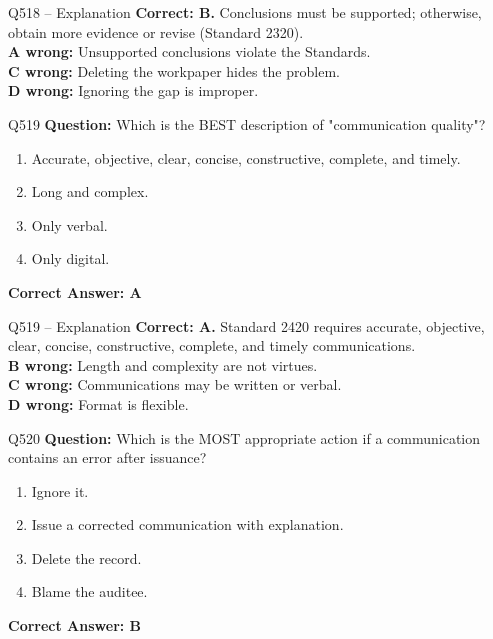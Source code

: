 \documentclass[aspectratio=169,10pt]{beamer}
\begin{document}
	\begin{frame}[t]{Q518 -- Explanation}
		\small
		\textbf{Correct: B.} Conclusions must be supported; otherwise, obtain more evidence or revise (Standard 2320). \\[4pt]
		\textbf{A wrong:} Unsupported conclusions violate the Standards. \\[2pt]
		\textbf{C wrong:} Deleting the workpaper hides the problem. \\[2pt]
		\textbf{D wrong:} Ignoring the gap is improper.
	\end{frame}
	
	\begin{frame}[t]{Q519}
		\small
		\textbf{Question:} Which is the BEST description of "communication quality"?
		\begin{enumerate}[label=\Alph*.,itemsep=1pt,topsep=2pt]
			\item Accurate, objective, clear, concise, constructive, complete, and timely.
			\item Long and complex.
			\item Only verbal.
			\item Only digital.
		\end{enumerate}
		\vspace{4pt}
		\textbf{Correct Answer: A}
	\end{frame}
	
	\begin{frame}[t]{Q519 -- Explanation}
		\small
		\textbf{Correct: A.} Standard 2420 requires accurate, objective, clear, concise, constructive, complete, and timely communications. \\[4pt]
		\textbf{B wrong:} Length and complexity are not virtues. \\[2pt]
		\textbf{C wrong:} Communications may be written or verbal. \\[2pt]
		\textbf{D wrong:} Format is flexible.
	\end{frame}
	
	\begin{frame}[t]{Q520}
		\small
		\textbf{Question:} Which is the MOST appropriate action if a communication contains an error after issuance?
		\begin{enumerate}[label=\Alph*.,itemsep=1pt,topsep=2pt]
			\item Ignore it.
			\item Issue a corrected communication with explanation.
			\item Delete the record.
			\item Blame the auditee.
		\end{enumerate}
		\vspace{4pt}
		\textbf{Correct Answer: B}
	\end{frame}
	
\end{document}
